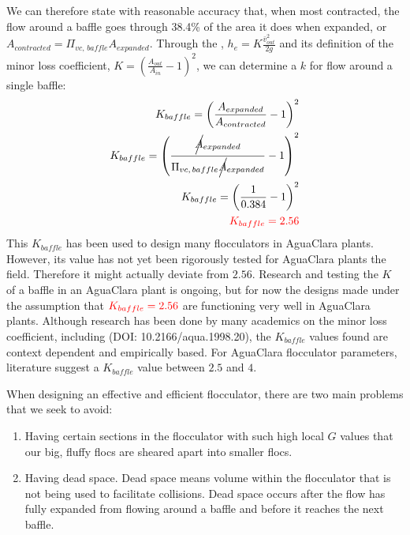 \documentclass[letterpaper,10pt,english]{sphinxmanual}
\begin{document}
We can therefore state with reasonable accuracy that, when most contracted, the flow around a baffle goes through 38.4\% of the area it does when expanded, or \(A_{contracted} = \Pi_{vc, \, baffle} A_{expanded}\). Through the , \(h_e = K \frac{\bar v_{out}^2}{2g}\) and its definition of the minor loss coefficient, \(K = \left( \frac{A_{out}}{A_{in}} -1 \right)^2\), we can determine a \(k\) for flow around a single baffle:
\begin{align}\label{equation:Flocculation/Floc_Design:Flocculation/Floc_Design:7}\!\begin{aligned}
K_{baffle} = \left( \frac{A_{expanded}}{A_{contracted}} -1 \right)^2\\
K_{baffle} = \left( \frac{\rlap{\Big/} A_{expanded}}{\Pi_{vc, \, baffle} \rlap{\Big/} A_{expanded}} -1 \right)^2\\
K_{baffle} = \left( \frac{1}{0.384} -1 \right)^2\\
\color{red}{K_{baffle} = 2.56}\\
\end{aligned}\end{align}
This \(K_{baffle}\) has been used to design many flocculators in AguaClara plants. However, its value has not yet been rigorously tested for AguaClara plants the field. Therefore it might actually deviate from \(2.56\). Research and testing the \(K\) of a baffle in an AguaClara plant is ongoing, but for now the designs made under the assumption that \(\color{red}{K_{baffle} = 2.56}\) are functioning very well in AguaClara plants. Although research has been done by many academics on the minor loss coefficient, including   (DOI: 10.2166/aqua.1998.20), the \(K_{baffle}\) values found are context dependent and empirically based. For AguaClara flocculator parameters, literature suggest a \(K_{baffle}\) value between \(2.5\) and \(4\).

When designing an effective and efficient flocculator, there are two main problems that we seek to avoid:
\begin{enumerate}
\item {} 
Having certain sections in the flocculator with such high local \(G\) values that our big, fluffy flocs are sheared apart into smaller flocs.

\item {} 
Having dead space. Dead space means volume within the flocculator that is not being used to facilitate collisions. Dead space occurs after the flow has fully expanded from flowing around a baffle and before it reaches the next baffle.

\end{enumerate}
\end{document}
